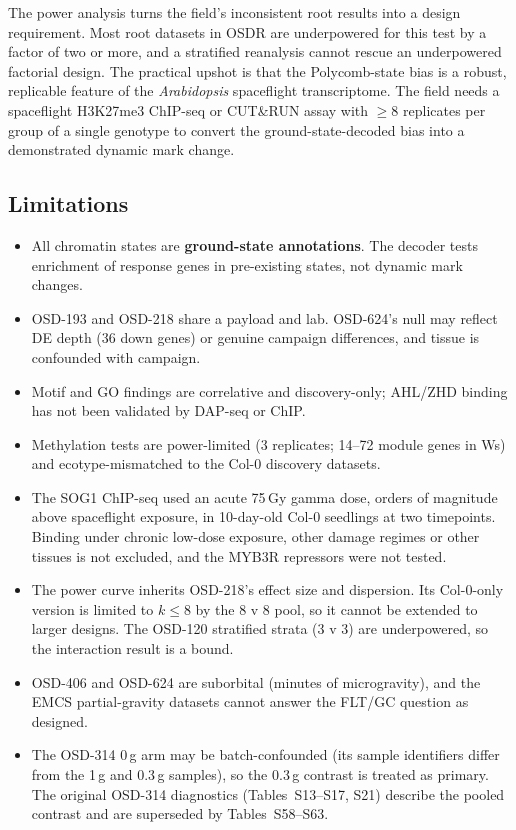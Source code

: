 \documentclass[11pt,a4paper]{article}
\begin{document}
The power analysis turns the field's inconsistent root results into a design
requirement. Most root datasets in OSDR are underpowered for this test by a factor of two
or more, and a stratified reanalysis cannot rescue an underpowered factorial design.
The practical upshot is that the Polycomb-state bias is a robust, replicable feature of the
\textit{Arabidopsis} spaceflight transcriptome. The field needs a spaceflight
H3K27me3 ChIP-seq or CUT\&RUN assay with $\ge$8 replicates per group of a single genotype to convert the
ground-state-decoded bias into a demonstrated dynamic mark change.

\subsection*{Limitations}

\begin{itemize}
\item All chromatin states are \textbf{ground-state annotations}. The decoder tests
  enrichment of response genes in pre-existing states, not dynamic mark changes.
\item OSD-193 and OSD-218 share a payload and lab. OSD-624's null may reflect DE depth (36 down
  genes) or genuine campaign differences, and tissue is confounded with campaign.
\item Motif and GO findings are correlative and discovery-only; AHL/ZHD binding has not been validated by
  DAP-seq or ChIP.
\item Methylation tests are power-limited (3 replicates; 14--72 module genes in Ws) and
  ecotype-mismatched to the Col-0 discovery datasets.
\item The SOG1 ChIP-seq used an acute 75\,Gy gamma dose, orders of magnitude above spaceflight exposure, in 10-day-old
  Col-0 seedlings at two timepoints. Binding under chronic low-dose exposure, other damage regimes or other tissues is not
  excluded, and the MYB3R repressors were not tested.
\item The power curve inherits OSD-218's effect size and dispersion. Its Col-0-only version is limited to
  $k\le8$ by the 8 v 8 pool, so it cannot be extended to larger designs. The OSD-120 stratified strata (3 v 3) are
  underpowered, so the interaction result is a bound.
\item OSD-406 and OSD-624 are suborbital (minutes of microgravity), and the EMCS partial-gravity datasets
  cannot answer the FLT/GC question as designed.
\item The OSD-314 0\,g arm may be batch-confounded (its sample identifiers differ from the 1\,g and 0.3\,g
  samples), so the 0.3\,g contrast is treated as primary. The original OSD-314 diagnostics (Tables~S13--S17, S21)
  describe the pooled contrast and are superseded by Tables~S58--S63.
\end{itemize}
\end{document}
